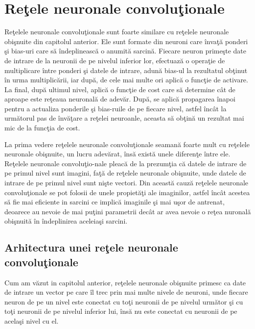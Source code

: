 \chapter{Re\c{t}ele neuronale convolu\c{t}ionale}

Re\c{t}elele neuronale convolu\c{t}ionale  sunt foarte similare cu re\c{t}elele neuronale obi\c{s}nuite din capitolul anterior. Ele sunt formate din neuroni care \^{i}nva\c{t}\u{a} ponderi \c{s}i bias-uri care s\u{a} \^{i}ndeplineasc\u{a} o anumit\u{a} sarcin\u{a}. Fiecare neuron prime\c{s}te date de intrare de la neuronii de pe nivelul inferior lor, efectuaz\u{a} o opera\c{t}ie de multiplicare \^{i}ntre ponderi \c{s}i datele de intrare, adun\u{a} bias-ul la rezultatul ob\c{t}inut \^{i}n urma multiplic\u{a}rii, iar dup\u{a}, de cele mai multe ori aplic\u{a} o func\c{t}ie de activare. La final, dup\u{a} ultimul nivel, aplic\u{a} o func\c{t}ie de cost care s\u{a} determine c\^{a}t de aproape este re\c{t}eaua neuronal\u{a} de adev\u{a}r. Dup\u{a}, se aplic\u{a} propagarea \^{i}napoi pentru a actualiza ponderile \c{s}i bias-ruile de pe fiecare nivel, astfel \^{i}nc\^{a}t la urm\u{a}torul pas de \^{i}nv\u{a}\c{t}are a re\c{t}elei neuroanle, aceasta s\u{a} ob\c{t}in\u{a} un rezultat mai mic de la func\c{t}ia de cost.

La prima vedere re\c{t}elele neuronale convolu\c{t}ionale seaman\u{a} foarte mult cu re\c{t}elele neuronale obi\c{s}nuite, un lucru adev\u{a}rat, \^{i}ns\u{a} exist\u{a} unele diferen\c{t}e \^{i}ntre ele. Re\c{t}elele neuronale convolu\c{t}io-nale pleac\u{a} de la prezum\c{t}ia c\u{a} datele de intrare de pe primul nivel sunt imagini, fa\c{t}\u{a} de re\c{t}elele neuronale obi\c{s}nuite, unde datele de intrare de pe primul nivel sunt ni\c{s}te vectori. Din aceast\u{a} cauz\u{a} re\c{t}elele neuronale convolu\c{t}ionale se pot folosii de unele propiet\u{a}\c{t}i ale imaginilor, astfel \^{i}nc\^{a}t acestea s\u{a} fie mai eficiente in sarcini ce implic\u{a} imaginile \c{s}i mai u\c{s}or de antrenat, deoarece au nevoie de mai pu\c{t}ini parametrii dec\^{a}t ar avea nevoie o re\c{t}ea nuronal\u{a} obi\c{s}nuit\u{a} \^{i}n \^{i}ndeplinirea aceleia\c{s}i sarcini.

\section{Arhitectura unei re\c{t}ele neuronale convolu\c{t}ionale}

Cum am v\u{a}zut in capitolul anterior, re\c{t}elele neuronale obi\c{s}nuite primesc ca date de intrare un  vector pe care \^{i}l trec prin mai multe nivele de neuroni, unde fiecare neuron de pe un nivel este conectat cu to\c{t}i neuronii de pe nivelul urm\u{a}tor \c{s}i cu to\c{t}i neuronii de pe nivelul inferior lui, \^{i}ns\u{a} nu este conectat cu neuronii de pe acela\c{s}i nivel cu el. 

